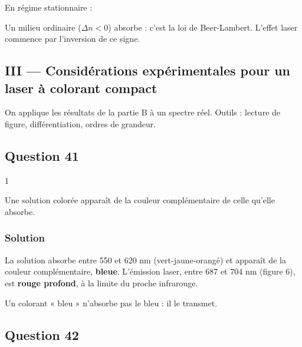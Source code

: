 \documentclass[11pt,a4paper]{article}
\newcommand{\equationajustee}[1]{%
  \sbox{\boiteequation}{$\displaystyle #1$}%
  \ifdim\wd\boiteequation>\linewidth
    \[\resizebox{\linewidth}{!}{\usebox{\boiteequation}}\]%
  \else
    \[#1\]%
  \fi}
\begin{document}
En régime stationnaire :

\equationajustee{\boxed{\gamma>0\iff\Delta n>0\iff\Gamma>A}}

\begin{methode}

Un milieu ordinaire (\(\Delta n<0\)) absorbe : c'est la loi de Beer-Lambert. L'effet laser commence par l'inversion de ce signe.

\end{methode}

\hypertarget{iii-considuxe9rations-expuxe9rimentales-pour-un-laser-uxe0-colorant-compact}{%
\subsection{III --- Considérations expérimentales pour un laser à colorant compact}\label{iii-considuxe9rations-expuxe9rimentales-pour-un-laser-uxe0-colorant-compact}}

On applique les résultats de la partie B à un spectre réel. Outils : lecture de figure, différentiation, ordres de grandeur.

\hypertarget{question-41}{%
\subsection{Question 41}\label{question-41}}

\begin{indication}{1}

Une solution colorée apparaît de la couleur complémentaire de celle qu'elle absorbe.

\end{indication}

\hypertarget{solution-40}{%
\subsubsection{Solution}\label{solution-40}}

La solution absorbe entre 550 et 620 nm (vert-jaune-orangé) et apparaît de la couleur complémentaire, \textbf{bleue}. L'émission laser, entre 687 et 704 nm (figure 6), est \textbf{rouge profond}, à la limite du proche infrarouge.

\begin{piege}

Un colorant « bleu » n'absorbe pas le bleu : il le transmet.

\end{piege}

\hypertarget{question-42}{%
\subsection{Question 42}\label{question-42}}
\end{document}
